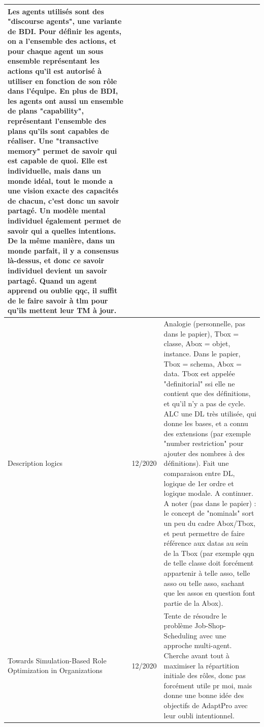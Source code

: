 \documentclass[french]{article}
\begin{document}
\begin{table}[ht!]
\begin{center}
\begin{tabular}{|p{}|p{}|p{}|}
            Les agents utilisés sont des "discourse agents", une variante de BDI.
            Pour définir les agents, on a l'ensemble des actions, et pour chaque agent un sous ensemble représentant les actions qu'il est autorisé à utiliser en fonction de son rôle dans l'équipe. En plus de BDI, les agents ont aussi un ensemble de plans "capability", représentant l'ensemble des plans qu'ils sont capables de réaliser.
            Une "transactive memory" permet de savoir qui est capable de quoi. Elle est individuelle, mais dans un monde idéal, tout le monde a une vision exacte des capacités de chacun, c'est donc un savoir partagé. Un modèle mental individuel également permet de savoir qui a quelles intentions. De la même manière, dans un monde parfait, il y a consensus là-dessus, et donc ce savoir individuel devient un savoir partagé.
            Quand un agent apprend ou oublie qqc, il suffit de le faire savoir à tlm pour qu'ils mettent leur TM à jour.
            \\
            \hline
            Description logics\cite{baader_chapter_2008}
            & 12/2020
            & Analogie (personnelle, pas dans le papier), Tbox = classe, Abox = objet, instance. Dans le papier, Tbox = schema, Abox = data.
            Tbox est appelée "definitorial" ssi elle ne contient que des définitions, et qu'il n'y a pas de cycle.
            ALC une DL très utilisée, qui donne les bases, et a connu des extensions (par exemple "number restriction" pour ajouter des nombres à des définitions). Fait une comparaison entre DL, logique de 1er ordre et logique modale. A continuer.
            A noter (pas dans le papier) : le concept de "nominals" sort un peu du cadre Abox/Tbox, et peut permettre de faire référence aux datas au sein de la Tbox (par exemple qqn de telle classe doit forcément appartenir à telle asso, telle asso ou telle asso, sachant que les assos en question font partie de la Abox).
            \\
            \hline
            Towards Simulation-Based Role Optimization in Organizations \cite{reuter_towards_2017}
            & 12/2020
            & Tente de résoudre le problème Job-Shop-Scheduling avec une approche multi-agent. Cherche avant tout à maximiser la répartition initiale des rôles, donc pas forcément utile pr moi, mais donne une bonne idée des objectifs de AdaptPro avec leur oubli intentionnel.\\
            \hline
        \end{tabular}
    \end{center}
    \end{table}
\end{document}
